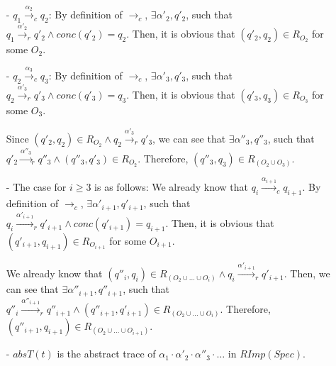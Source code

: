 \begin{itemize}
\setlength{\itemsep}{0.5pt}
\item[-] $q_1 {\xrightarrow{\alpha_2}}_c q_2$: By definition of $\rightarrow_c$, $\exists \alpha'_2, q'_2$, such that $q_1 {\xrightarrow{\alpha'_2}}_r q'_2 \wedge conc(q'_2)=q_2$. Then, it is obvious that $(q'_2,q_2) \in R_{O_2}$ for some $O_2$.

\item[-] $q_2 {\xrightarrow{\alpha_3}}_c q_3$: By definition of $\rightarrow_c$, $\exists \alpha'_3, q'_3$, such that $q_2 {\xrightarrow{\alpha'_3}}_r q'_3 \wedge conc(q'_3)=q_3$. Then, it is obvious that $(q'_3,q_3) \in R_{O_3}$ for some $O_3$.

Since $(q'_2,q_2) \in R_{O_2} \wedge q_2 {\xrightarrow{\alpha'_3}}_r q'_3$, we can see that $\exists \alpha''_3,q''_3$, such that $q'_2 {\xrightarrow{\alpha''_3}}_r q''_3 \wedge (q''_3,q'_3) \in R_{O_2}$. Therefore, $(q''_3,q_3) \in R_{(O_2 \cup O_3)}$.

\item[-] The case for $i \geq 3$ is as follows: We already know that $q_i {\xrightarrow{\alpha_{i+1}}}_c q_{i+1}$. By definition of $\rightarrow_c$, $\exists \alpha'_{i+1}, q'_{i+1}$, such that $q_i {\xrightarrow{\alpha'_{i+1}}}_r q'_{i+1} \wedge conc(q'_{i+1})=q_{i+1}$. Then, it is obvious that $(q'_{i+1},q_{i+1}) \in R_{O_{i+1}}$ for some $O_{i+1}$.

We already know that $(q''_i,q_i) \in R_{(O_2 \cup \ldots \cup O_i)} \wedge q_i {\xrightarrow{\alpha'_{i+1}}}_r q'_{i+1}$. Then, we can see that $\exists \alpha''_{i+1},q''_{i+1}$, such that $q''_i {\xrightarrow{\alpha''_{i+1}}}_r q''_{i+1} \wedge (q''_{i+1},q'_{i+1}) \in R_{(O_2 \cup \ldots \cup O_i)}$. Therefore, $(q''_{i+1},q_{i+1}) \in R_{(O_2 \cup \ldots \cup O_{i+1})}$.



\item[-] $absT(t)$ is the abstract trace of $\alpha_1 \cdot \alpha'_2 \cdot \alpha''_3 \cdot \ldots$ in $RImp(Spec)$.
\end{itemize}

